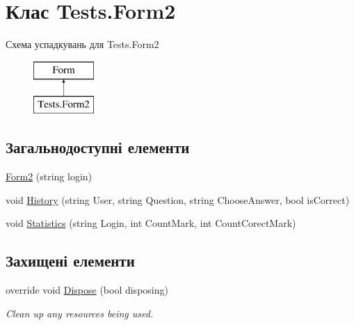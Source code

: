 \hypertarget{class_tests_1_1_form2}{}\section{Клас Tests.\+Form2}
\label{class_tests_1_1_form2}
Схема успадкувань для Tests.\+Form2\begin{figure}[H]
\begin{center}
\leavevmode
\includegraphics[height=2.000000cm]{class_tests_1_1_form2}
\end{center}
\end{figure}
\subsection*{Загальнодоступні елементи}
\begin{DoxyCompactItemize}
\item 
\hyperlink{class_tests_1_1_form2_a7e39b93c958b8e506e2d4da276f89e4d}{Form2} (string login)
\item 
void \hyperlink{class_tests_1_1_form2_af571b5761eaae8749d8c0fa64394dbc0}{History} (string User, string Question, string Choose\+Answer, bool is\+Correct)
\item 
void \hyperlink{class_tests_1_1_form2_af44e8c4f06da0c032f679825743fba6a}{Statistics} (string Login, int Count\+Mark, int Count\+Corect\+Mark)
\end{DoxyCompactItemize}
\subsection*{Захищені елементи}
\begin{DoxyCompactItemize}
\item 
override void \hyperlink{class_tests_1_1_form2_a8213f04aa4b31d28ee9f1a0f8842fb29}{Dispose} (bool disposing)
\begin{DoxyCompactList}\small\item\em Clean up any resources being used. \end{DoxyCompactList}\end{DoxyCompactItemize}
